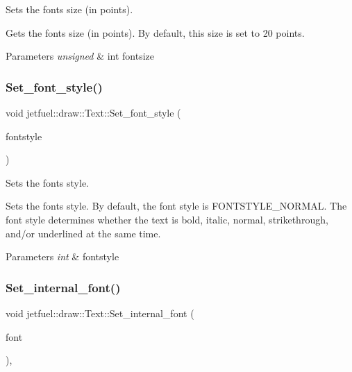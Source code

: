 Sets the font\textquotesingle{}s size (in points). 

Gets the font\textquotesingle{}s size (in points). By default, this size is set to 20 points.


\begin{DoxyParams}{Parameters}
{\em unsigned} & int fontsize \\
\hline
\end{DoxyParams}
\mbox{\label{classjetfuel_1_1draw_1_1Text_aec048bedd8cacb8523c4b2a3121f4179}} 
\subsubsection{\texorpdfstring{Set\+\_\+font\+\_\+style()}{Set\_font\_style()}}
{\footnotesize\ttfamily void jetfuel\+::draw\+::\+Text\+::\+Set\+\_\+font\+\_\+style (\begin{DoxyParamCaption}\item[{const int}]{fontstyle }\end{DoxyParamCaption})\hspace{0.3cm}{\ttfamily [inline]}}



Sets the font\textquotesingle{}s style. 

Sets the font\textquotesingle{}s style. By default, the font style is F\+O\+N\+T\+S\+T\+Y\+L\+E\+\_\+\+N\+O\+R\+M\+AL. The font style determines whether the text is bold, italic, normal, strikethrough, and/or underlined at the same time.


\begin{DoxyParams}{Parameters}
{\em int} & fontstyle \\
\hline
\end{DoxyParams}
\mbox{\label{classjetfuel_1_1draw_1_1Text_ae52e5068a74da2daaa78fffeed5e4dc3}} 
\subsubsection{\texorpdfstring{Set\+\_\+internal\+\_\+font()}{Set\_internal\_font()}}
{\footnotesize\ttfamily void jetfuel\+::draw\+::\+Text\+::\+Set\+\_\+internal\+\_\+font (\begin{DoxyParamCaption}\item[{\hyperlink{classjetfuel_1_1draw_1_1Font}{Font}}]{font }\end{DoxyParamCaption})\hspace{0.3cm}{\ttfamily [inline]}, {\ttfamily [protected]}}



